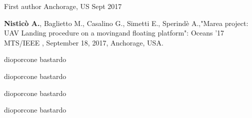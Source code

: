 

\begin{cventries}

  \cventry
    {First author} %
    {} %
    {Anchorage, US} %
    {Sept 2017} %
    {
      \begin{cvitems} %
        \item {\textbf{Nisticò A.}, Baglietto M., Casalino G., Simetti E., Sperindè A.,"Marea project: UAV Landing procedure on a movingand floating platform": Oceans ’17 MTS/IEEE , September 18, 2017, Anchorage, USA.}
      \end{cvitems}
    }

\end{cventries}
\begin{cvskills}
\cvskill
{dioporcone}
{bastardo}

\cvskill
{dioporcone}
{bastardo}

\cvskill
{dioporcone}
{bastardo}

\cvskill
{dioporcone}
{bastardo}
\end{cvskills}